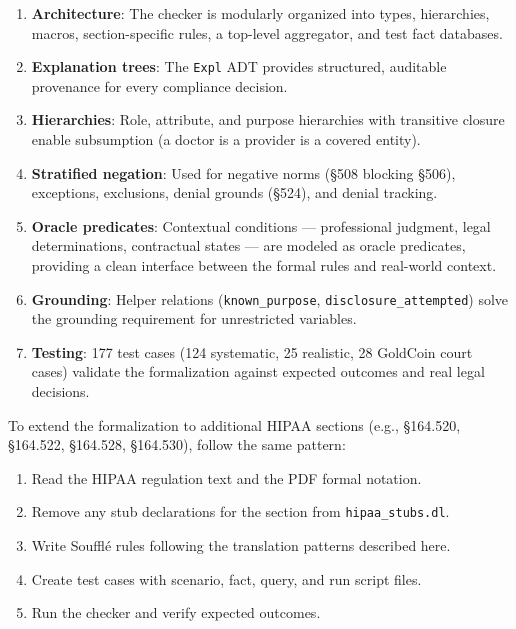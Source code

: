 \documentclass[11pt,letterpaper]{article}
\begin{document}
\begin{enumerate}
  \item \textbf{Architecture}: The checker is modularly organized into types, hierarchies, macros, section-specific rules, a top-level aggregator, and test fact databases.

  \item \textbf{Explanation trees}: The \texttt{Expl} ADT provides structured, auditable provenance for every compliance decision.

  \item \textbf{Hierarchies}: Role, attribute, and purpose hierarchies with transitive closure enable subsumption (a doctor is a provider is a covered entity).

  \item \textbf{Stratified negation}: Used for negative norms (\S 508 blocking \S 506), exceptions, exclusions, denial grounds (\S 524), and denial tracking.

  \item \textbf{Oracle predicates}: Contextual conditions --- professional judgment, legal determinations, contractual states --- are modeled as oracle predicates, providing a clean interface between the formal rules and real-world context.

  \item \textbf{Grounding}: Helper relations (\texttt{known\_purpose}, \texttt{disclosure\_attempted}) solve the grounding requirement for unrestricted variables.

  \item \textbf{Testing}: 177 test cases (124 systematic, 25 realistic, 28 GoldCoin court cases) validate the formalization against expected outcomes and real legal decisions.
\end{enumerate}

To extend the formalization to additional HIPAA sections (e.g., \S 164.520, \S 164.522, \S 164.528, \S 164.530), follow the same pattern:
\begin{enumerate}
  \item Read the HIPAA regulation text and the PDF formal notation.
  \item Remove any stub declarations for the section from \texttt{hipaa\_stubs.dl}.
  \item Write Souffl\'{e} rules following the translation patterns described here.
  \item Create test cases with scenario, fact, query, and run script files.
  \item Run the checker and verify expected outcomes.
\end{enumerate}
\end{document}
